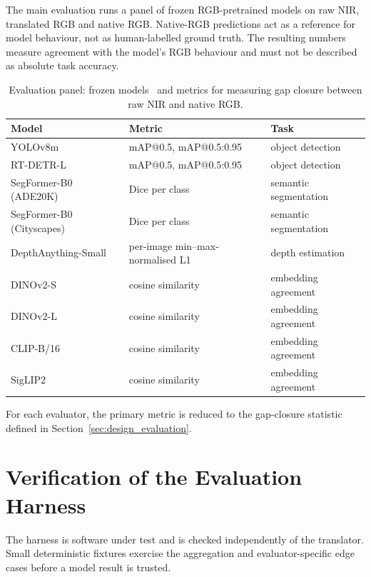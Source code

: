 The main evaluation runs a panel of frozen RGB-pretrained models on raw NIR, translated RGB and native RGB. Native-RGB predictions act as a reference for model behaviour, not as human-labelled ground truth. The resulting numbers measure agreement with the model's RGB behaviour and must not be described as absolute task accuracy.

\begin{table}[H]
\centering
\scriptsize
\setlength{\tabcolsep}{3pt}
\begin{tabular}{lll}
\hline
\textbf{Model} & \textbf{Metric} & \textbf{Task} \\
\hline
YOLOv8m & mAP@0.5, mAP@0.5:0.95 & object detection \\
RT-DETR-L & mAP@0.5, mAP@0.5:0.95 & object detection \\
SegFormer-B0 (ADE20K) & Dice per class & semantic segmentation \\
SegFormer-B0 (Cityscapes) & Dice per class & semantic segmentation \\
DepthAnything-Small & per-image min--max-normalised L1 & depth estimation \\
DINOv2-S & cosine similarity & embedding agreement \\
DINOv2-L & cosine similarity & embedding agreement \\
CLIP-B/16 & cosine similarity & embedding agreement \\
SigLIP2 & cosine similarity & embedding agreement \\
\hline
\end{tabular}
\caption{Evaluation panel: frozen models~\cite{jocher2023yolov8,zhao2024rtdetr,xie2021segformer,yang2024depthanything,oquab2024dinov2,radford2021clip,tschannen2025siglip2} and metrics for measuring gap closure between raw NIR and native RGB.}
\label{tab:downstream_panel_test}
\end{table}

For each evaluator, the primary metric is reduced to the gap-closure statistic defined in Section~\ref{sec:design_evaluation}.

\section{Verification of the Evaluation Harness}
\label{sec:test_harness_verify}

The harness is software under test and is checked independently of the translator. Small deterministic fixtures exercise the aggregation and evaluator-specific edge cases before a model result is trusted.

